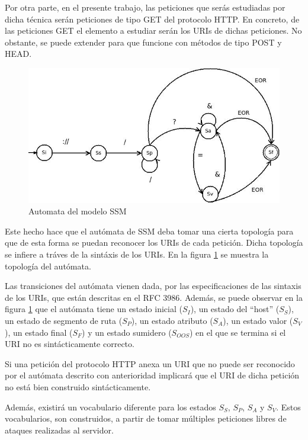 Por otra parte, en el presente trabajo, las peticiones que ser\'as estudiadas por dicha t\'ecnica ser\'an peticiones de tipo GET del protocolo HTTP. En concreto, de las peticiones GET el elemento a estudiar ser\'an los URIs de dichas peticiones. No obstante, se puede extender para que funcione con m\'etodos de tipo POST y HEAD. 

\begin{figure}
\begin{center}
  \includegraphics[width=\linewidth]{./img/ssm.jpeg}
  \caption{Automata del modelo SSM}
  \label{fig:ssm}
\end{center}

\end{figure}

Este hecho hace que el autómata de SSM deba tomar una cierta topolog\'ia para que de esta forma se puedan reconocer los URIs de cada petici\'on. Dicha topolog\'ia se infiere a tráves de la sint\'axis de los URIs. En la figura \ref{fig:ssm} se muestra la topolog\'ia del autómata.

Las transiciones del autómata vienen dada, por las especificaciones de las sintaxis de los URIs, que est\'an descritas en el RFC 3986. Adem\'as, se puede observar en la figura \ref{fig:ssm} que el autómata tiene un estado inicial ($S_{I}$), un estado del ``host'' ($S_{S}$), un estado de segmento de ruta ($S_{P}$), un estado atributo ($S_{A}$), un estado valor ($S_{V}$), un estado final ($S_{F}$) y un estado sumidero ($S_{OOS}$) en el que se termina si el URI no es sint\'acticamente correcto.

Si una petici\'on del protocolo HTTP anexa un URI que no puede ser reconocido por el autómata descrito con anterioridad implicar\'a que el URI de dicha petici\'on no est\'a bien construido sintácticamente.

Adem\'as, existirá un vocabulario diferente para los estados $S_{S}$, $S_{P}$, $S_{A}$ y $S_{V}$. Estos vocabularios, son construidos, a partir de tomar m\'ultiples peticiones libres de ataques realizadas al servidor. 

